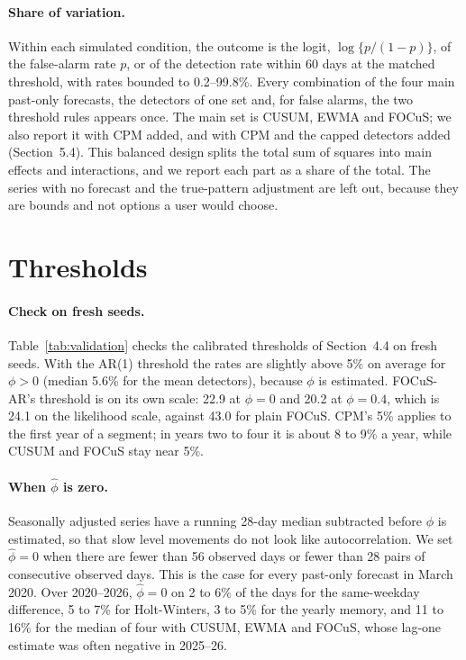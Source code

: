 \paragraph{Share of variation.} Within each simulated condition, the outcome is the logit, $\log\{p/(1-p)\}$, of the false-alarm rate $p$, or of the detection rate within 60 days at the matched threshold, with rates bounded to 0.2--99.8\%. Every combination of the four main past-only forecasts, the detectors of one set and, for false alarms, the two threshold rules appears once. The main set is CUSUM, EWMA and FOCuS; we also report it with CPM added, and with CPM and the capped detectors added (Section~5.4). This balanced design splits the total sum of squares into main effects and interactions, and we report each part as a share of the total. The series with no forecast and the true-pattern adjustment are left out, because they are bounds and not options a user would choose.

\section{Thresholds}\label{app:d-thresholds}

\paragraph{Check on fresh seeds.} Table~\ref{tab:validation} checks the calibrated thresholds of Section~4.4 on fresh seeds. With the AR(1) threshold the rates are slightly above 5\% on average for $\phi > 0$ (median 5.6\% for the mean detectors), because $\phi$ is estimated. FOCuS-AR's threshold is on its own scale: 22.9 at $\phi = 0$ and 20.2 at $\phi = 0.4$, which is 24.1 on the likelihood scale, against 43.0 for plain FOCuS. CPM's 5\% applies to the first year of a segment; in years two to four it is about 8 to 9\% a year, while CUSUM and FOCuS stay near 5\%.



\paragraph{When $\hat\phi$ is zero.} Seasonally adjusted series have a running 28-day median subtracted before $\phi$ is estimated, so that slow level movements do not look like autocorrelation. We set $\hat\phi = 0$ when there are fewer than 56 observed days or fewer than 28 pairs of consecutive observed days. This is the case for every past-only forecast in March 2020. Over 2020--2026, $\hat\phi=0$ on 2 to 6\% of the days for the same-weekday difference, 5 to 7\% for Holt-Winters, 3 to 5\% for the yearly memory, and 11 to 16\% for the median of four with CUSUM, EWMA and FOCuS, whose lag-one estimate was often negative in 2025--26.

